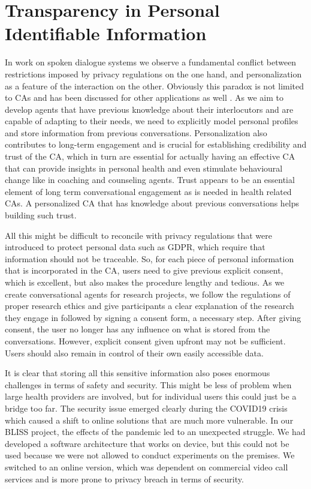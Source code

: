 \documentclass[sigchi-a,nonacm]{acmart}
\begin{document}
\section{Transparency in Personal Identifiable Information} 
In work on spoken dialogue systems we observe a fundamental conflict between restrictions imposed by privacy regulations on the one hand, and personalization as a feature of the interaction on the other. Obviously this paradox is not limited to CAs and has been discussed for other applications as well \cite{awad2006personalization}. As we aim to develop agents that have previous knowledge about their interlocutors and are capable of adapting to their needs, we need to explicitly model personal profiles and store information from previous conversations. Personalization also contributes to long-term engagement and is crucial for establishing credibility and trust of the CA, which in turn are essential for actually having an effective CA that can provide insights in personal health and even stimulate behavioural change like in coaching and counseling agents. Trust appears to be an essential element of long term conversational engagement \cite{Bickmore2005} as is needed in health related CAs. A personalized CA that has knowledge about previous conversations helps building such trust.

All this might be difficult to reconcile with privacy regulations that were introduced to protect personal data such as GDPR, which require that information should not be traceable. So, for each piece of personal information that is incorporated in the CA, users need to give previous explicit consent, which is excellent, but also makes the procedure lengthy and tedious. 
As we create conversational agents for research projects, we follow the regulations of proper research ethics and give participants a clear explanation of the research they engage in followed by signing a consent form, a necessary step. After giving consent, the user no longer has any influence on what is stored from the conversations.
However, explicit consent given upfront may not be sufficient. Users should also remain in control of their own easily accessible data.

It is clear that storing all this sensitive information also poses enormous challenges in terms of safety and security. This might be less of problem when large health providers are involved, but for individual users this could just be a bridge too far. %
The security issue emerged clearly during the COVID19 crisis which caused a shift to online solutions that are much more vulnerable. In our BLISS project, the effects of the pandemic led to an unexpected struggle. We had developed a software architecture that works on device, but this could not be used because we were not allowed to conduct experiments on the premises. We switched to an online version, which was dependent on commercial video call services and is more prone to privacy breach in terms of security.
\end{document}
